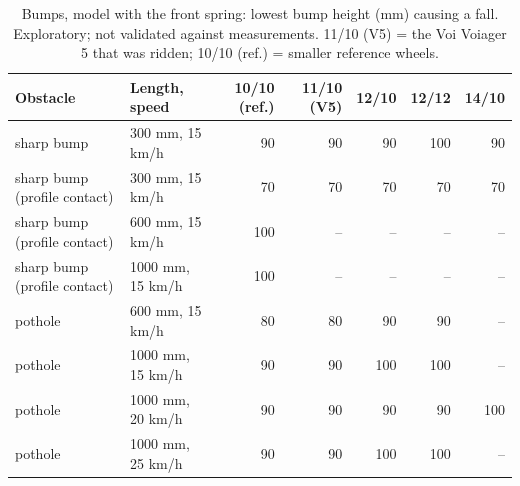 \begin{table}[htbp]
\centering\small
\caption{Bumps, model with the front spring: lowest bump height (mm) causing a fall. Exploratory; not validated against measurements. 11/10 (V5) = the Voi Voiager 5 that was ridden; 10/10 (ref.) = smaller reference wheels.}\label{tab:D4}
\begin{tabular}{@{}llrrrrr@{}}
\toprule
Obstacle & Length, speed & 10/10 (ref.) & 11/10 (V5) & 12/10 & 12/12 & 14/10 \\
\midrule
sharp bump & 300 mm, 15 km/h & 90 & 90 & 90 & 100 & 90 \\
sharp bump (profile contact) & 300 mm, 15 km/h & 70 & 70 & 70 & 70 & 70 \\
sharp bump (profile contact) & 600 mm, 15 km/h & 100 & -- & -- & -- & -- \\
sharp bump (profile contact) & 1000 mm, 15 km/h & 100 & -- & -- & -- & -- \\
pothole & 600 mm, 15 km/h & 80 & 80 & 90 & 90 & -- \\
pothole & 1000 mm, 15 km/h & 90 & 90 & 100 & 100 & -- \\
pothole & 1000 mm, 20 km/h & 90 & 90 & 90 & 90 & 100 \\
pothole & 1000 mm, 25 km/h & 90 & 90 & 100 & 100 & -- \\
\bottomrule
\end{tabular}
\end{table}
